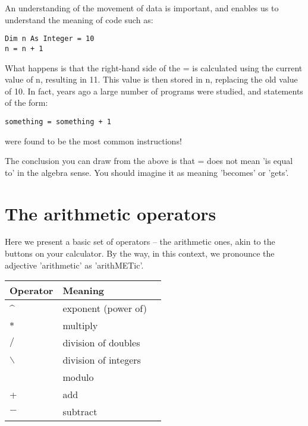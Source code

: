 		An understanding of the movement of data is important, and enables us to understand the meaning of code such as:
		\begin{lstlisting}
Dim n As Integer = 10
n = n + 1
		\end{lstlisting}
		What happens is that the right-hand side of the = is calculated using the current value of n, resulting in 11. This value is then stored in n, replacing the old value of 10. In fact, years ago a large number of programs were studied, and statements of the form:
		\begin{lstlisting}
something = something + 1
		\end{lstlisting}
		were found to be the most common instructions!
		
		The conclusion you can draw from the above is that = does not mean 'is equal to' in the algebra sense. You should imagine it as meaning 'becomes' or 'gets'.
	\section{The arithmetic operators}
		Here we present a basic set of operators – the arithmetic ones, akin to the buttons on your calculator. By the way, in this context, we pronounce the adjective 'arithmetic' as 'arithMETic'.

		\begin{center}
			\begin{tabular}{lll}
				\toprule Operator & Meaning\\ \midrule
				\textasciicircum & exponent (power of)\\ \midrule
				$*$ & multiply\\
				$ / $ & division of doubles\\
				$ \backslash $ & division of integers\\
				\keyword{Mod} & modulo\\ \midrule
				+ & add\\
				$-$ & subtract\\ \bottomrule
			\end{tabular}
		\end{center}

